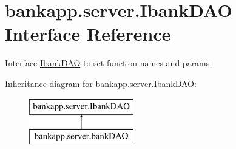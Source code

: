 \hypertarget{interfacebankapp_1_1server_1_1IbankDAO}{}\section{bankapp.\+server.\+Ibank\+D\+AO Interface Reference}
\label{interfacebankapp_1_1server_1_1IbankDAO}


Interface \hyperlink{interfacebankapp_1_1server_1_1IbankDAO}{Ibank\+D\+AO} to set function names and params.  


Inheritance diagram for bankapp.\+server.\+Ibank\+D\+AO\+:\begin{figure}[H]
\begin{center}
\leavevmode
\includegraphics[height=2.000000cm]{interfacebankapp_1_1server_1_1IbankDAO}
\end{center}
\end{figure}
